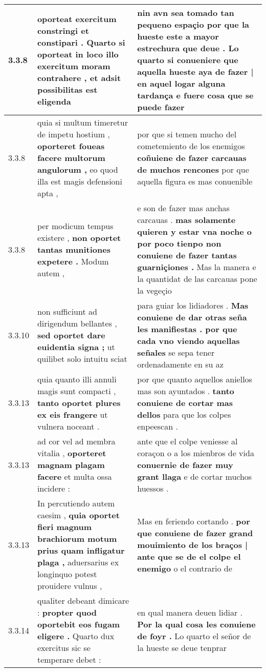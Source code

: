 \begin{tabular}{|p{1cm}|p{6.5cm}|p{6.5cm}|}
3.3.8 & oporteat exercitum constringi et constipari . \textbf{ Quarto si oporteat in loco illo exercitum moram contrahere , } et adsit possibilitas est eligenda & nin avn sea tomado tan pequeno espaçio por que la hueste este a mayor estrechura que deue . \textbf{ Lo quarto si conueniere que aquella hueste aya de fazer | en aquel logar alguna tardança } e fuere cosa que se puede fazer \\\hline
3.3.8 & quia si multum timeretur de impetu hostium , \textbf{ oporteret foueas facere multorum angulorum , } eo quod illa est magis defensioni apta , & por que si temen mucho del cometemiento de los enemigos \textbf{ coñuiene de fazer carcauas de muchos rencones } por que aquella figura es mas conuenible \\\hline
3.3.8 & per modicum tempus existere , \textbf{ non oportet tantas munitiones expetere . } Modum autem , & e son de fazer mas anchas carcauas . \textbf{ mas solamente quieren y estar vna noche o por poco tienpo non conuiene de fazer tantas guarniçiones . } Mas la manera e la quantidat de las carcauas pone la vegeçio \\\hline
3.3.10 & non sufficiunt ad dirigendum bellantes , \textbf{ sed oportet dare euidentia signa ; } ut quilibet solo intuitu sciat & para guiar los lidiadores . \textbf{ Mas conuiene de dar otras seña les manifiestas . por que cada vno viendo aquellas señales } se sepa tener ordenadamente en su az \\\hline
3.3.13 & quia quanto illi annuli magis sunt compacti , \textbf{ tanto oportet plures ex eis frangere } ut vulnera noceant . & por que quanto aquellos aniellos mas son ayuntados . \textbf{ tanto conuiene de cortar mas dellos } para que los colpes enpeescan . \\\hline
3.3.13 & ad cor vel ad membra vitalia , \textbf{ oporteret magnam plagam facere } et multa ossa incidere : & ante que el colpe veniesse al coraçon o a los mienbros de vida \textbf{ conuernie de fazer muy grant llaga } e de cortar muchos huessos . \\\hline
3.3.13 & In percutiendo autem caesim , \textbf{ quia oportet fieri magnum brachiorum motum prius quam infligatur plaga , } aduersarius ex longinquo potest prouidere vulnus , & Mas en feriendo cortando . \textbf{ por que conuiene de fazer grand mouimiento de los braços | ante que se de el colpe el enemigo } o el contrario de \\\hline
3.3.14 & qualiter debeant dimicare : \textbf{ propter quod oportebit eos fugam eligere . } Quarto dux exercitus sic se temperare debet : & en qual manera deuen lidiar . \textbf{ Por la qual cosa les conuiene de foyr . } Lo quarto el señor de la hueste se deue tenprar \\\hline

\end{tabular}
